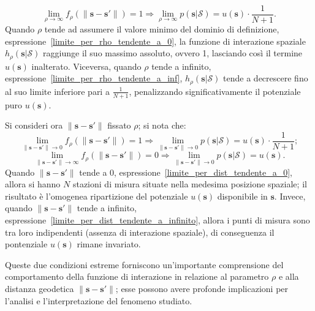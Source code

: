 \begin{equation}
	\lim_{\rho \to \infty} f_\rho(\|\mathbf{s} - \mathbf{s}'\|) = 1
	\Rightarrow \lim_{\rho \to \infty} p(\mathbf{s}| \mathcal{S}) = u(\mathbf{s})\cdot\frac{1}{N + 1} .
	\label{limite_per_rho_tendente_a_inf}
\end{equation}
Quando $\rho$ tende ad assumere il valore minimo del dominio di definizione, espressione~\ref{limite_per_rho_tendente_a_0}, la funzione di interazione spaziale $h_\rho(\mathbf{s}|\mathcal{S})$ raggiunge il suo massimo assoluto, ovvero \num{1}, lasciando così il termine $u(\mathbf{s})$ inalterato. Viceversa, quando 
$\rho$ tende a infinito, espressione~\ref{limite_per_rho_tendente_a_inf}, $h_\rho(\mathbf{s}|\mathcal{S})$ tende a decrescere fino al suo limite inferiore pari a $\frac{1}{N+1}$, penalizzando significativamente il potenziale puro $u(\mathbf{s})$.
\par Si consideri ora $\|\mathbf{s} - \mathbf{s}'\|$ fissato $\rho$; si nota che:
\begin{equation}
	\lim_{\|\mathbf{s} - \mathbf{s}' \| \to 0} f_\rho(\|\mathbf{s} - \mathbf{s}'\|) = 1
	\Rightarrow \lim_{\|\mathbf{s} - \mathbf{s}' \| \to 0} p(\mathbf{s}| \mathcal{S}) = u(\mathbf{s})\cdot\frac{1}{N+1};
	\label{limite_per_dist_tendente_a_0}
\end{equation}
\begin{equation}
	\lim_{\|\mathbf{s} - \mathbf{s}' \| \to \infty} f_\rho(\|\mathbf{s} - \mathbf{s}'\|) = 0
	\Rightarrow \lim_{\|\mathbf{s} - \mathbf{s}' \| \to 0} p(\mathbf{s}| \mathcal{S}) = u(\mathbf{s}).
	\label{limite_per_dist_tendente_a_infinito}
\end{equation}
Quando $\|\mathbf{s} - \mathbf{s}'\|$ tende a \num{0}, espressione~\ref{limite_per_dist_tendente_a_0}, allora si hanno $N$ stazioni di misura situate nella medesima posizione spaziale; il risultato è l'omogenea ripartizione del potenziale $u(\mathbf{s})$ disponibile in $\mathbf{s}$. Invece, quando $\|\mathbf{s} - \mathbf{s}'\|$ tende a infinito, espressione~\ref{limite_per_dist_tendente_a_infinito}, allora i punti di misura sono tra loro indipendenti (assenza di interazione spaziale), di conseguenza il pontenziale $u(\mathbf{s})$ rimane invariato.
\par Queste due condizioni estreme forniscono un'importante comprensione del comportamento della funzione di interazione in relazione al parametro $\rho$ e alla distanza geodetica $\|\mathbf{s} - \mathbf{s}'\|$; esse possono avere profonde implicazioni per l'analisi e l'interpretazione del fenomeno studiato.

